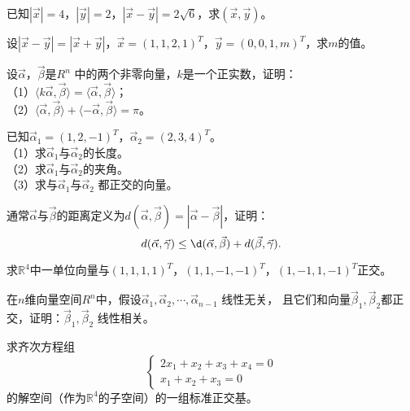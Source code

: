 \begin{ex}\label{6.5}
已知$|\vec{x}|=4$，$|\vec{y}|=2$，$|\vec{x}-\vec{y}|=2\sqrt{6}$，求$(\vec{x},\vec{y})$。
\end{ex}

\begin{ex}\label{6.6}
设$|\vec{x}-\vec{y}|=|\vec{x}+\vec{y}|$，$\vec{x}=(1,1,2,1)^T$，$\vec{y}=(0,0,1,m)^T$，求$m$的值。
\end{ex}

\begin{ex}\label{6.7}
设$\vec{\alpha}$，$\vec{\beta}$是$R^n$ 中的两个非零向量，$k$是一个正实数，证明：\\
（1）$\langle k\vec{\alpha},\vec{\beta}\rangle=\langle\vec{\alpha},\vec{\beta}\rangle$；\\
（2）$\langle\vec{\alpha},\vec{\beta}\rangle+\langle-\vec{\alpha},\vec{\beta}\rangle=\pi$。
\end{ex}

\begin{ex}\label{6.8}
已知$\vec{\alpha}_1=(1,2,-1)^T$，$\vec{\alpha}_2=(2,3,4)^T$。\\
（1）求$\vec{\alpha}_1$与$\vec{\alpha}_2$的长度。\\
（2）求$\vec{\alpha}_1$与$\vec{\alpha}_2$的夹角。\\
（3）求与$\vec{\alpha}_1$与$\vec{\alpha}_2$ 都正交的向量。
\end{ex}

\begin{ex}\label{6.9}
通常$\vec{\alpha}$与$\vec{\beta}$的距离定义为$d(\vec{\alpha},\vec{\beta})=|\vec{\alpha}-\vec{\beta}|$，证明：
\begin{equation*}
d(\vec{\alpha},\vec{\gamma})\leq\d(\vec{\alpha},\vec{\beta})+d(\vec{\beta},\vec{\gamma}).
\end{equation*}
\end{ex}

\begin{ex}\label{6.10}
求$\mathbb{R}^4$中一单位向量与$(1,1,1,1)^T$，$(1,1,-1,-1)^T$，$(1,-1,1,-1)^T$正交。
\end{ex}

\begin{ex}\label{6.11}
在$n$维向量空间$R^{n}$中，假设$\vec{\alpha}_1,\vec{\alpha}_2,\cdots,\vec{\alpha}_{n-1}$ 线性无关，
且它们和向量$\vec{\beta}_1,\vec{\beta}_2$都正交，证明：$\vec{\beta}_1,\vec{\beta}_2$ 线性相关。\\
\end{ex}

\begin{ex}\label{6.12}
求齐次方程组
\begin{equation*}
  \begin{cases}
  2x_1+x_2+x_3+x_4=0\\
  x_1+x_2+x_3=0
  \end{cases}
\end{equation*}
的解空间（作为$\mathbb{R}^4$的子空间）的一组标准正交基。
\end{ex}

